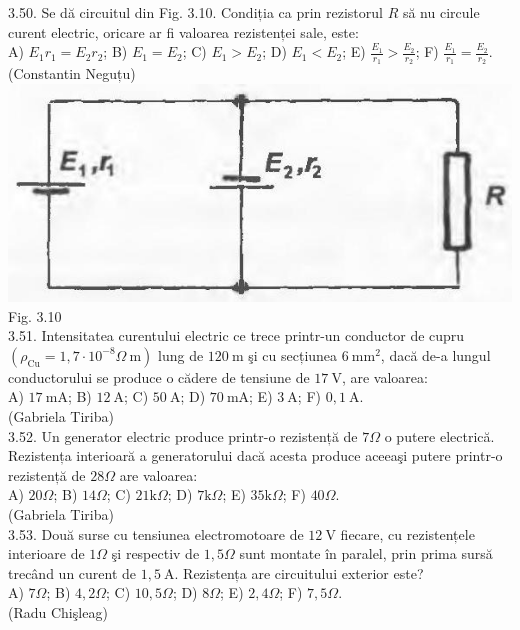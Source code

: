 3.50. Se dă circuitul din Fig. 3.10. Condiția ca prin rezistorul $R$ să nu circule curent electric, oricare ar fi valoarea rezistenței sale, este:\\ A) $E_{1} r_{1}=E_{2} r_{2}$; B) $E_{1}=E_{2}$; C) $E_{1}>E_{2}$; D) $E_{1}<E_{2}$; E) $\frac{E_{1}}{r_{1}}>\frac{E_{2}}{r_{2}}$; F) $\frac{E_{1}}{r_{1}}=\frac{E_{2}}{r_{2}}$.\\ (Constantin Neguțu)\\ \includegraphics[width=0.4\linewidth]{images/2025_07_01_5b3ff9fa0d508c8e9f17g-154} Fig. 3.10\\

3.51. Intensitatea curentului electric ce trece printr-un conductor de cupru $\left(\rho_{\mathrm{Cu}}=1,7 \cdot 10^{-8} \Omega \mathrm{~m}\right)$ lung de $120 \mathrm{~m}$ şi cu secțiunea $6 \mathrm{~mm}^{2}$, dacă de-a lungul conductorului se produce o cădere de tensiune de $17 \mathrm{~V}$, are valoarea:\\ A) $17 \mathrm{~mA}$; B) $12 \mathrm{~A}$; C) $50 \mathrm{~A}$; D) $70 \mathrm{~mA}$; E) $3 \mathrm{~A}$; F) $0,1 \mathrm{~A}$.\\ (Gabriela Tiriba)\\

3.52. Un generator electric produce printr-o rezistență de $7 \Omega$ o putere electrică. Rezistența interioară a generatorului dacă acesta produce aceeaşi putere printr-o rezistență de $28 \Omega$ are valoarea:\\ A) $20 \Omega$; B) $14 \Omega$; C) $21 \mathrm{k} \Omega$; D) $7 \mathrm{k} \Omega$; E) $35 \mathrm{k} \Omega$; F) $40 \Omega$.\\ (Gabriela Tiriba)\\

3.53. Două surse cu tensiunea electromotoare de $12 \mathrm{~V}$ fiecare, cu rezistențele interioare de $1 \Omega$ şi respectiv de $1,5 \Omega$ sunt montate în paralel, prin prima sursă trecând un curent de $1,5 \mathrm{~A}$. Rezistența are circuitului exterior este?\\ A) $7 \Omega$; B) $4,2 \Omega$; C) $10,5 \Omega$; D) $8 \Omega$; E) $2,4 \Omega$; F) $7,5 \Omega$.\\ (Radu Chişleag)\\


